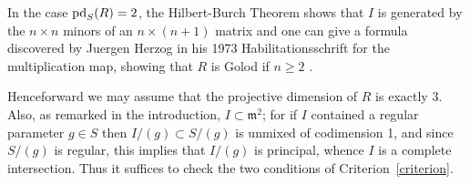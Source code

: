 \documentclass[11pt]{amsart}
\def\phi{{\varphi}}
\def\gm{{\mathfrak m}}
\begin{document}
In the case $\operatorname{pd}_{S}(R) = 2$, the Hilbert-Burch Theorem shows that $I$ is generated by the $n\times n$ minors of an $n\times(n+1)$
matrix and one can give a formula discovered by Juergen Herzog in his 1973 Habilitationsschrift for the multiplication map, showing that $R$ is Golod if $n\geq 2$ \cite[5.3.4]{AvramovInfinite}. 

%
%
%

Henceforward we may assume that the projective dimension of $R$ is exactly 3. 
Also, as remarked in the introduction, $I\subset \gm^{2}$; for if $I$ contained
a regular parameter $g\in S$ then $I/(g)\subset S/(g)$ is unmixed of codimension 1, and 
since $S/(g)$ is regular, this implies that $I/(g)$ is principal, whence $I$ is a complete intersection.
Thus it suffices to check the two conditions of Criterion~\ref{criterion}.
\end{document}
